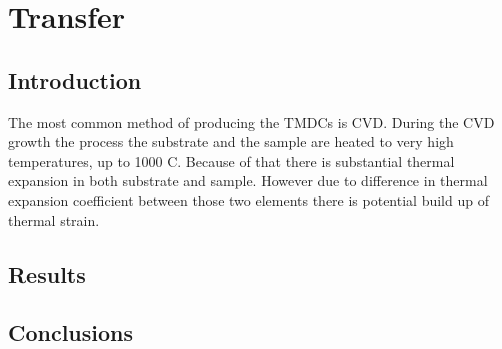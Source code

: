 \section{Transfer}
	\subsection{Introduction}
		The most common method of producing the TMDCs is CVD. During the CVD growth the process the substrate and the sample are heated to very high temperatures, up to 1000 {\degree}C. Because of that there is substantial thermal expansion in both substrate and sample. However due to difference in thermal expansion coefficient between those two elements there is potential build up of thermal strain.
	\subsection{Results}
	\subsection{Conclusions}